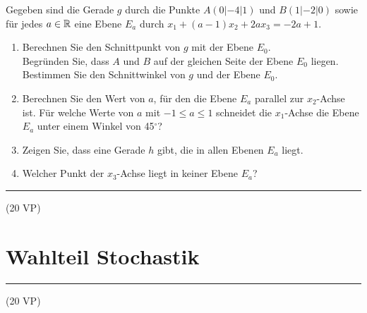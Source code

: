 \aufgabe{}
Gegeben sind die Gerade $g$ durch die Punkte $A(0|-4|1)$ und $B(1|-2|0)$ sowie für jedes $a\in\mathbb{R}$ eine Ebene $E_a$ durch $x_1+(a-1)x_2+2ax_3=-2a+1$.
\begin{enumerate}
  \item Berechnen Sie den Schnittpunkt von $g$ mit der Ebene $E_0$.\\
  Begründen Sie, dass $A$ und $B$ auf der gleichen Seite der Ebene $E_0$ liegen.\\
  Bestimmen Sie den Schnittwinkel von $g$ und der Ebene $E_0$. 

  \item Berechnen Sie den Wert von $a$, für den die Ebene $E_a$ parallel zur $x_2$-Achse ist. Für welche Werte von $a$ mit $-1\leq a\leq 1$ schneidet die $x_1$-Achse die Ebene $E_a$ unter einem Winkel von 45$^\circ$? 

  \item Zeigen Sie, dass eine Gerade $h$ gibt, die in allen Ebenen $E_a$ liegt. 

  \item Welcher Punkt der $x_3$-Achse liegt in keiner Ebene $E_a$? 
\end{enumerate}
\begin{lsg}{}

\end{lsg}

\aufgabe{}



\vfill

\hfill\rule{1.5cm}{0.4mm}

\hfill (20 VP)\hspace{0.22cm}


\section{Wahlteil Stochastik}

\aufgabe{}

\aufgabe{}
\aufgabe{}
\aufgabe{}


\vfill

\hfill\rule{1.5cm}{0.4mm}

\hfill (20 VP)\hspace{0.22cm}


